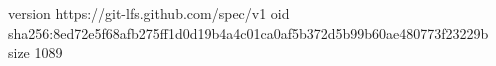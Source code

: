 version https://git-lfs.github.com/spec/v1
oid sha256:8ed72e5f68afb275ff1d0d19b4a4c01ca0af5b372d5b99b60ae480773f23229b
size 1089
